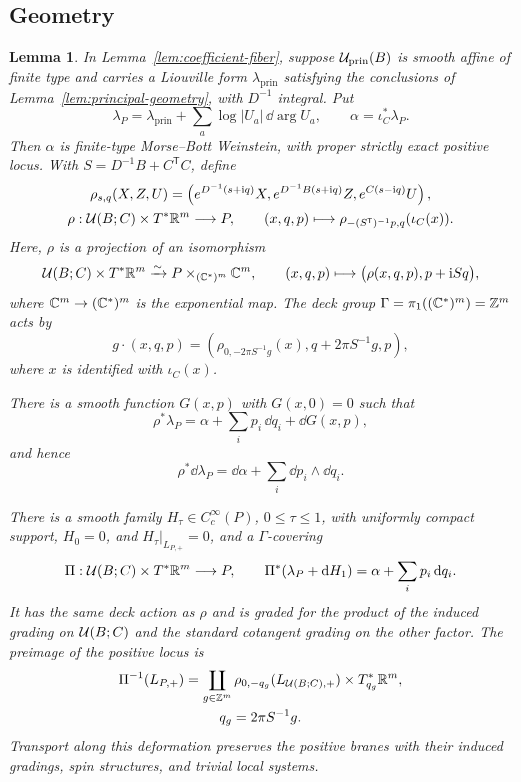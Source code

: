 \documentclass[12pt, letter]{amsart}
\newtheorem{lemma}[theorem]{Lemma}
\theoremstyle{definition}
\newcommand{\Z}{\mathbb Z}
\newcommand{\pr}{\mathrm{prin}}
\numberwithin{equation}{section}
\begin{document}
\subsection{Geometry}

\begin{lemma}\label{lem:coefficient-geometry}
In Lemma~\ref{lem:coefficient-fiber}, suppose $\cU_{\pr}(B)$ is
smooth affine of finite type and carries a Liouville form
$\lambda_{\pr}$ satisfying the conclusions of
Lemma~\ref{lem:principal-geometry}, with $D^{-1}$ integral. Put
\[
 \lambda_P=\lambda_{\pr}+\sum_a\log|U_a|\,\dd\arg U_a,
 \qquad \alpha=\iota_C^*\lambda_P.
\]
Then $\alpha$ is finite-type Morse--Bott Weinstein, with proper
strictly exact positive locus.
With $S=D^{-1}B+C^{\mathsf T}C$, define
\[
 \begin{gathered}
 \rho_{s,q}(X,Z,U)=
 \left(e^{D^{-1}(s+\mathrm iq)}X,
       e^{D^{-1}B(s+\mathrm iq)}Z,e^{C(s-\mathrm iq)}U\right),\\
 \rho:\mathcal{U}(B;C)\times T^*\mathbb R^m\longrightarrow P,\qquad
 (x,q,p)\longmapsto\rho_{-(S^{\mathsf T})^{-1}p,q}(\iota_C(x)).
 \end{gathered}
\]
Here, $\rho$ is a projection of an isomorphism
\[
 \mathcal{U}(B;C)\times T^*\mathbb R^m
 \xrightarrow{\sim} P\times_{(\mathbb C^*)^m}\mathbb C^m,\qquad
 (x,q,p)\longmapsto\bigl(\rho(x,q,p),p+\mathrm iSq\bigr),
\]
where $\mathbb C^m\to(\mathbb C^*)^m$ is the exponential map.  The deck group $\Gamma= \pi_1((\C^*)^m)=\Z^m$ acts by 
\[
 g\cdot(x,q,p)=
 \left(\rho_{0,-2\pi S^{-1}g}(x),q+2\pi S^{-1}g,p\right),
\]
where $x$ is identified with $\iota_C(x)$.

There is a smooth function $G(x,p)$ with $G(x,0)=0$ such that
\[
 \rho^*\lambda_P=\alpha+\sum_i p_i\,\dd q_i+\dd G(x,p),
\]
and hence
\begin{equation}\label{eq:split-real-form}
 \rho^*\dd\lambda_P=\dd\alpha+\sum_i\dd p_i\wedge\dd q_i.
\end{equation}

There is a smooth family $H_\tau\in C^\infty_c(P)$, $0\le\tau\le1$,
with uniformly compact support, $H_0=0$, and $H_\tau|_{L_{P,+}}=0$,
and a $\Gamma$-covering
\[
 \Pi:\mathcal{U}(B;C)\times T^*\mathbb R^m\longrightarrow P,
 \qquad
 \Pi^*(\lambda_P+\mathrm{d} H_1)=\alpha+\sum_i p_i\,\mathrm{d} q_i.
\]
It has the same deck action as $\rho$ and is graded for the product of the
induced grading on $\mathcal{U}(B;C)$ and the standard cotangent grading on the other factor.
The preimage of the positive locus is
\[
 \begin{gathered}
 \Pi^{-1}(L_{P,+})=
 \coprod_{g\in\Z^m}
 \rho_{0,-q_g}(L_{\cU(B;C),+})\times T^*_{q_g}\R^m,\\
 q_g=2\pi S^{-1}g.
 \end{gathered}
\]
Transport along this deformation preserves the positive branes with their induced gradings,
spin structures, and trivial local systems.
\end{lemma}
\end{document}
